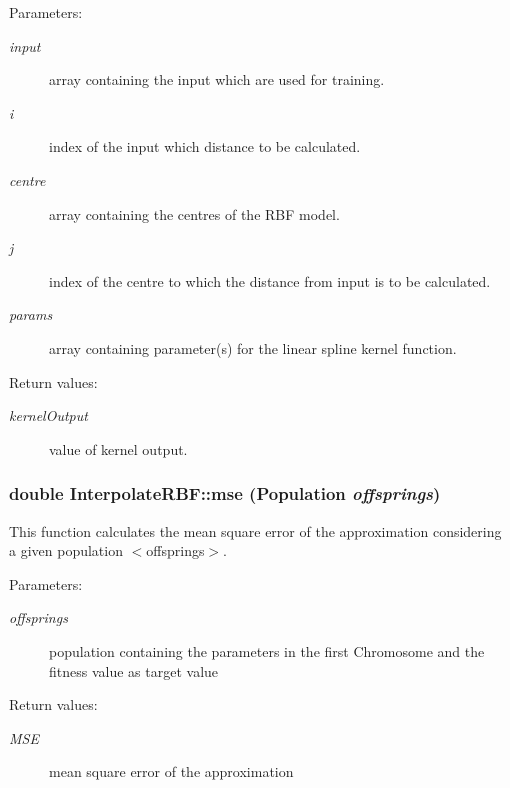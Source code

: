 \begin{Desc}
\item[Parameters:]
\begin{description}
\item[{\em input}]array containing the input which are used for training. \item[{\em i}]index of the input which distance to be calculated. \item[{\em centre}]array containing the centres of the RBF model. \item[{\em j}]index of the centre to which the distance from input is to be calculated. \item[{\em params}]array containing parameter(s) for the linear spline kernel function. \end{description}
\end{Desc}
\begin{Desc}
\item[Return values:]
\begin{description}
\item[{\em kernel\-Output}]value of kernel output.\end{description}
\end{Desc}
\subsubsection{\setlength{\rightskip}{0pt plus 5cm}double Interpolate\-RBF::mse (Population {\em offsprings})}\label{classInterpolateRBF_a7}


This function calculates the mean square error of the approximation considering a given population $<$offsprings$>$. 

\begin{Desc}
\item[Parameters:]
\begin{description}
\item[{\em offsprings}]population containing the parameters in the first Chromosome and the fitness value as target value \end{description}
\end{Desc}
\begin{Desc}
\item[Return values:]
\begin{description}
\item[{\em MSE}]mean square error of the approximation\end{description}
\end{Desc}
